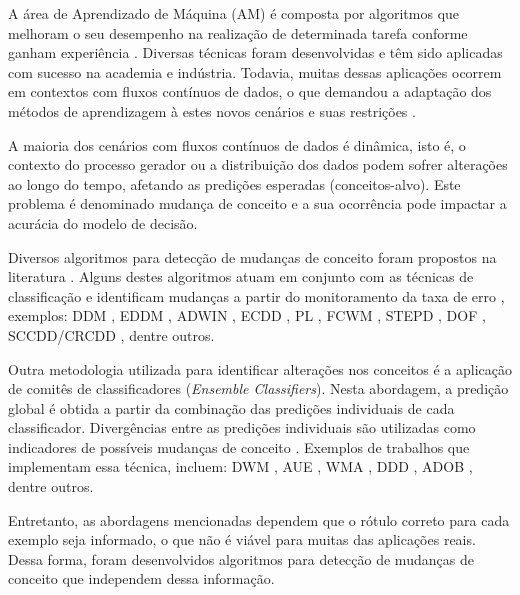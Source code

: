 \documentclass[qual, classic, a4paper]{ufbathesis}
\begin{document}
A área de Aprendizado de Máquina (AM) é composta por algoritmos que melhoram o seu desempenho na realização de determinada tarefa conforme ganham experiência \cite{Mitchell:1997:ML:541177}.
Diversas técnicas foram desenvolvidas e têm sido aplicadas com sucesso na academia e indústria.
Todavia, muitas dessas aplicações ocorrem em contextos com fluxos contínuos de dados, o que demandou a adaptação dos métodos de aprendizagem à estes novos cenários e suas restrições \cite{Bifet:2009:ALM:1656274.1656287}.

A maioria dos cenários com fluxos contínuos de dados é dinâmica, isto é, o contexto do processo gerador ou a distribuição dos dados podem sofrer alterações ao longo do tempo, afetando as predições esperadas (conceitos-alvo).
Este problema é denominado mudança de conceito \cite{Gama:2010:KDD:1855075} e a sua ocorrência pode impactar a acurácia do modelo de decisão.

Diversos algoritmos para detecção de mudanças de conceito foram propostos na literatura \cite{Gama:2014:SCD:2597757.2523813}. 
Alguns destes algoritmos atuam em conjunto com as técnicas de classificação e identificam mudanças a partir do monitoramento da taxa de erro \cite{Gama:2014:SCD:2597757.2523813}, 
exemplos: DDM \cite{GamaMCR04}, EDDM \cite{EDDM},  
ADWIN \cite{BifetG07}, ECDD \cite{Ross:2012:EWM:2076039.2076307}, 
PL \cite{Bach:PL:2008}, FCWM \cite{FCWM}, STEPD \cite{STEPD}, DOF \cite{Sobhani:2011:NDD:2045295.2045309}, 
SCCDD/CRCDD \cite{daCosta:2016:UDS:2956219.2956389}, dentre outros.

Outra metodologia utilizada para identificar alterações nos conceitos é a aplicação de comitês de classificadores (\textit{Ensemble Classifiers}). 
Nesta abordagem, a predição global é obtida a partir da combinação das predições individuais de cada classificador.
Divergências entre as predições individuais são utilizadas como indicadores de possíveis mudanças de conceito \cite{Gama:2014:SCD:2597757.2523813}.
Exemplos de trabalhos que implementam essa técnica, incluem:
DWM \cite{Kolter:2007:DWM:1314498.1390333}, AUE \cite{AUE}, 
WMA \cite{Blum1997}, DDD \cite{Minku:2012:DNE:2197077.2197204}, ADOB \cite{deCarvalhoSantos:2014:SUR:3120352.3120365}, dentre outros.

Entretanto, as abordagens mencionadas dependem que o rótulo correto para cada exemplo seja informado,
o que não é viável para muitas das aplicações reais.
Dessa forma, foram desenvolvidos algoritmos para detecção de mudanças de conceito que independem dessa informação.
\end{document}

